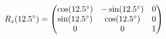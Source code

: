 \documentclass[preview]{standalone}
\begin{document}
\begin{align*}
\special{dvisvgm:raw <g id='unique000'>}R_z(12.5^\circ) = \begin{pmatrix} \cos(12.5^\circ) & -\sin(12.5^\circ) & 0 \\ \sin(12.5^\circ) & \cos(12.5^\circ) & 0 \\ 0 & 0 & 1 \end{pmatrix}\special{dvisvgm:raw </g>}
\end{align*}
\end{document}
